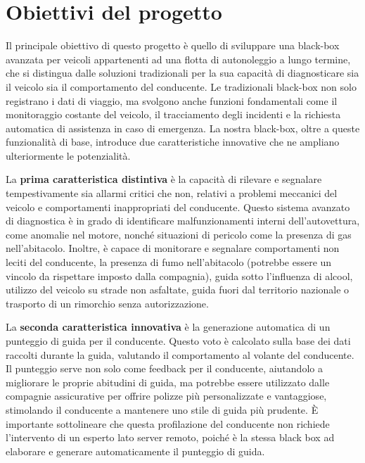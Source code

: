 \documentclass[12pt, a4paper, italian]{report}
\numberwithin{figure}{chapter}
\numberwithin{table}{chapter}
\begin{document}
\section{Obiettivi del progetto}
Il principale obiettivo di questo progetto è quello di sviluppare una black-box avanzata per veicoli appartenenti ad una flotta di autonoleggio a lungo termine, che si distingua dalle soluzioni tradizionali per la sua capacità di diagnosticare sia il veicolo sia il comportamento del conducente. Le tradizionali black-box non solo registrano i dati di viaggio, ma svolgono anche funzioni fondamentali come il monitoraggio costante del veicolo, il tracciamento degli incidenti e la richiesta automatica di assistenza in caso di emergenza. La nostra black-box, oltre a queste funzionalità di base, introduce due caratteristiche innovative che ne ampliano ulteriormente le potenzialità.

\vspace{1cm}

La \textbf{prima caratteristica distintiva} è la capacità di rilevare e segnalare tempestivamente sia allarmi critici che non, relativi a problemi meccanici del veicolo e comportamenti inappropriati del conducente. Questo sistema avanzato di diagnostica è in grado di identificare malfunzionamenti interni dell’autovettura, come anomalie nel motore, nonché situazioni di pericolo come la presenza di gas nell'abitacolo. Inoltre, è capace di monitorare e segnalare comportamenti non leciti del conducente, la presenza di fumo nell'abitacolo (potrebbe essere un vincolo da rispettare imposto dalla compagnia), guida sotto l'influenza di alcool, utilizzo del veicolo su strade non asfaltate, guida fuori dal territorio nazionale o trasporto di un rimorchio senza autorizzazione.

\vspace{1cm}

La \textbf{seconda caratteristica innovativa} è la generazione automatica di un punteggio di guida per il conducente. Questo voto è calcolato sulla base dei dati raccolti durante la guida, valutando il comportamento al volante del conducente. Il punteggio serve non solo come feedback per il conducente, aiutandolo a migliorare le proprie abitudini di guida, ma potrebbe essere utilizzato dalle compagnie assicurative per offrire polizze più personalizzate e vantaggiose, stimolando il conducente a mantenere uno stile di guida più prudente. È importante sottolineare che questa profilazione del conducente non richiede l'intervento di un esperto lato server remoto, poiché è la stessa black box ad elaborare e generare automaticamente il punteggio di guida.
\end{document}
